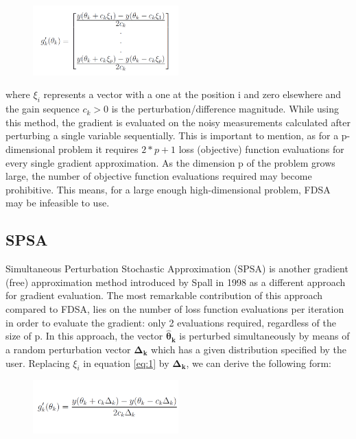 \begin{figure}[htpb]
  \centering
  \includegraphics[width=0.5\textwidth]{figures/equation_2_sided_fdsa.png}
  \label{fig:eq2}
\end{figure}

where \(\xi_i\) represents a vector with a one at the position i and zero elsewhere and the gain sequence \(c_k > 0\) is the perturbation/difference magnitude. While using this method, the gradient is evaluated on the noisy measurements calculated after perturbing a single variable sequentially. This is important to mention, as for a p-dimensional problem it requires \(2*p + 1\) loss (objective) function evaluations for every single gradient approximation. As the dimension p of the problem grows large, the number of objective function evaluations required may become prohibitive. This means, for a large enough high-dimensional problem, FDSA may be infeasible to use. 

\subsection{SPSA}
Simultaneous Perturbation Stochastic Approximation (SPSA) is another gradient (free) approximation method introduced by Spall in 1998 \parencite{spall:1998} as a different approach for gradient evaluation. The most remarkable contribution of this approach compared to FDSA, lies on the number of loss function evaluations per iteration in order to evaluate the gradient: only 2 evaluations required, regardless of the size of p. In this approach, the vector \(\boldsymbol{\hat{\theta}_k}\) is perturbed simultaneously by means of a random perturbation vector \(\boldsymbol{\Delta_k}\) which has a given distribution specified by the user. Replacing \(\xi_i\) in equation \ref{eq:1} by \(\boldsymbol{\Delta_k}\), we can derive the following form:

\begin{figure}[htpb]
  \centering
  \includegraphics[width=0.5\textwidth]{figures/equation_2_sided_spsa.png}
  \label{fig:eq3}
\end{figure}

